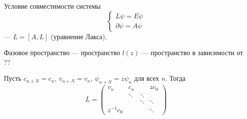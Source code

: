 \documentclass[12pt,a4paper]{article}
\begin{document}
    Условие совместимости системы
    \[
        \begin{cases}
            L \psi = E \psi\\
            \partial \psi = A \psi
        \end{cases}
    \]
    --- $\dot{L} = [A, L]$ (уравнение Лакса).

    Фазовое пространство --- пространство $l(z)$ --- пространство в зависимости от ??

    Пусть $c_{n + N} = c_n$, $v_{n + N} = v_n$, $\psi_{n+N} = z \psi_n$ для всех $n$. Тогда
    \[
        L = 
        \begin{pmatrix}
            v_n& c_n&& z c_0\\
            & \ddots& \ddots\\
            && \ddots& \ddots\\
            z^{-1} c_0 &&& \ddots
        \end{pmatrix}
    \]
\end{document}
